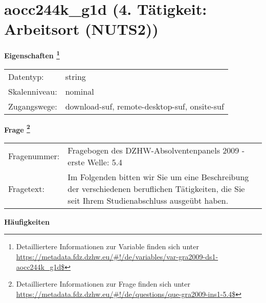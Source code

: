 
    \setcounter{footnote}{0}

    \vspace*{-1.8cm}
	\section{aocc244k\_g1d (4. Tätigkeit: Arbeitsort (NUTS2))}
	\label{section:aocc244k_g1d}



    \vspace*{0.5cm}
    \noindent\textbf{Eigenschaften
	\footnote{Detailliertere Informationen zur Variable finden sich unter
		\url{https://metadata.fdz.dzhw.eu/\#!/de/variables/var-gra2009-ds1-aocc244k_g1d$}}}\\
	\begin{tabularx}{\hsize}{@{}lX}
	Datentyp: & string \\
	Skalenniveau: & nominal \\
	Zugangswege: &
	  download-suf, 
	  remote-desktop-suf, 
	  onsite-suf
 \\
    \end{tabularx}



				\vspace*{0.5cm}
                \noindent\textbf{Frage
	                \footnote{Detailliertere Informationen zur Frage finden sich unter
		              \url{https://metadata.fdz.dzhw.eu/\#!/de/questions/que-gra2009-ins1-5.4$}}}\\
				\begin{tabularx}{\hsize}{@{}lX}
					Fragenummer: &
					  Fragebogen des DZHW-Absolventenpanels 2009 - erste Welle:
					  5.4
 \\
					Fragetext: & Im Folgenden bitten wir Sie um eine Beschreibung der verschiedenen beruflichen Tätigkeiten, die Sie seit Ihrem Studienabschluss ausgeübt haben. \\
				\end{tabularx}





        		\vspace*{0.5cm}
                \noindent\textbf{Häufigkeiten}

